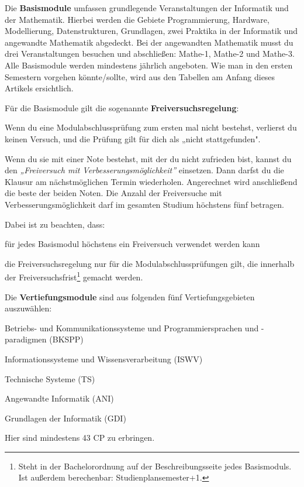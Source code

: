 Die \textbf{Basismodule} umfassen grundlegende Veranstaltungen der Informatik und der Mathematik. Hierbei werden die Gebiete Programmierung, Hardware, Modellierung, Datenstrukturen, Grundlagen, zwei Praktika in der Informatik und angewandte Mathematik abgedeckt. Bei der angewandten Mathematik musst du drei Veranstaltungen besuchen und abschließen: Mathe-1, Mathe-2 und Mathe-3. Alle Basismodule werden mindestens jährlich angeboten. Wie man in den ersten Semestern vorgehen könnte/sollte, wird aus den Tabellen am Anfang dieses Artikels ersichtlich.

Für die Basismodule gilt die sogenannte \textbf{Freiversuchsregelung}:
\begin{noindEnumerate}
	\item Wenn du eine Modulabschlussprüfung zum ersten mal nicht bestehst, verlierst du keinen Versuch, und die Prüfung gilt für dich als „nicht stattgefunden".
	\item Wenn du sie mit einer Note bestehst, mit der du nicht zufrieden bist, kannst du den \emph{„Freiversuch mit Verbesserungsmöglichkeit''} einsetzen. Dann darfst du die Klausur am nächstmöglichen Termin wiederholen. Angerechnet wird anschließend die beste der beiden Noten. Die Anzahl der Freiversuche mit Verbesserungsmöglichkeit darf im gesamten Studium höchstens fünf betragen.
\end{noindEnumerate}
Dabei ist zu beachten, dass:
\begin{noindEnumerate}
	\item für jedes Basismodul höchstens ein Freiversuch verwendet werden kann
	\item die Freiversuchsregelung nur für die Modulabschlussprüfungen gilt, die innerhalb der  Freiversuchsfrist\footnote{Steht in der Bachelorordnung auf der Beschreibungsseite jedes Basismoduls.\\ Ist außerdem berechenbar: Studienplansemester+1.} gemacht werden.
\end{noindEnumerate}

Die \textbf{Vertiefungsmodule} sind aus folgenden fünf Vertiefungsgebieten auszuwählen:

\begin{noindItemize}
	\item Betriebs- und Kommunikationssysteme und Programmiersprachen und -paradigmen (BKSPP)
	\item Informationssysteme und Wissensverarbeitung (ISWV)
	\item Technische Systeme (TS)
	\item Angewandte Informatik (ANI)
	\item Grundlagen der Informatik (GDI)
\end{noindItemize}
Hier sind mindestens 43 CP zu erbringen.

